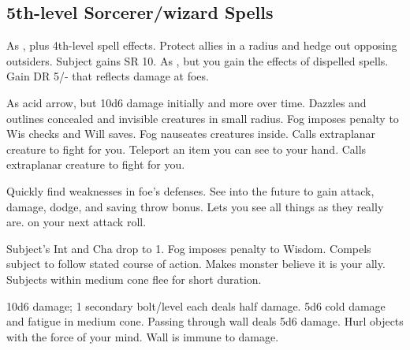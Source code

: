 \subsection{5th-level Sorcerer/wizard Spells} 
\begin{swspelllist}
 As , plus 4th-level spell effects.
 Protect allies in a \areamed radius and hedge out opposing outsiders.
 Subject gains SR 10.
 As , but you gain the effects of dispelled spells.
 Gain DR 5/- that reflects damage at foes.

 As acid arrow, but 10d6 damage initially and more over time.
 Dazzles and outlines concealed and invisible creatures in small radius.
 Fog imposes  penalty to Wis checks and Will saves.
 Fog nauseates creatures inside.
 Calls extraplanar creature to fight for you.
 Teleport an item you can see to your hand.
 Calls extraplanar creature to fight for you.

 Quickly find weaknesses in foe's defenses.
 See into the future to gain attack, damage, dodge, and saving throw bonus.
\M Lets you see all things as they really are.
  on your next attack roll.

 Subject's Int and Cha drop to 1.
 Fog imposes  penalty to Wisdom.
 Compels subject to follow stated course of action.
 Makes monster believe it is your ally.
 Subjects within medium cone flee for short duration.

 10d6 damage; 1 secondary bolt/level each deals half damage.
 5d6 cold damage and fatigue in medium cone.
 Passing through wall deals 5d6 damage.
 Hurl objects with the force of your mind.
 Wall is immune to damage.


\end{swspelllist}
